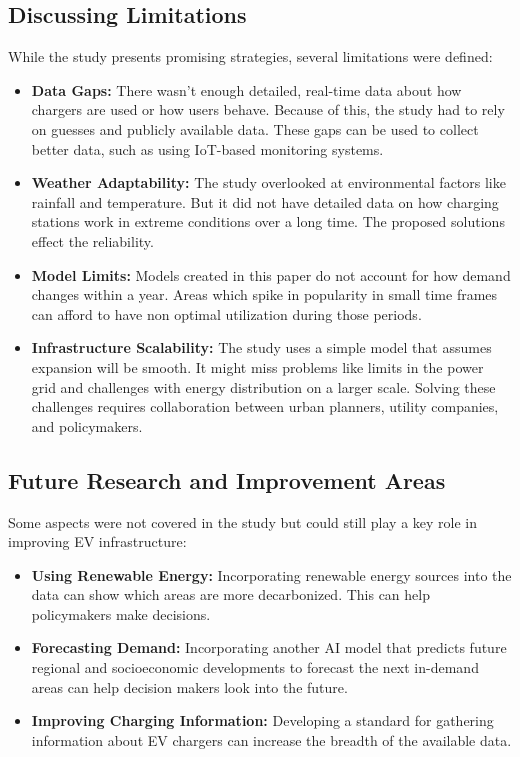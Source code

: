 \subsection{Discussing Limitations}
While the study presents promising strategies, several limitations were defined:
\begin{itemize}
    \item \textbf{Data Gaps:} There wasn’t enough detailed, real-time data about how chargers are used or how users behave. Because of this, the study had to rely on guesses and publicly available data. These gaps can be used to collect better data, such as using IoT-based monitoring systems.
\end{itemize}
\begin{itemize}
    \item \textbf{Weather Adaptability:} The study overlooked at environmental factors like rainfall and temperature. But it did not have detailed data on how charging stations work in extreme conditions over a long time. The proposed solutions effect the reliability.
\end{itemize}
\begin{itemize}
    \item \textbf{Model Limits:} Models created in this paper do not account for how demand changes within a year. Areas which spike in popularity in small time frames can afford to have non optimal utilization during those periods.
\end{itemize}
\begin{itemize}
    \item \textbf{Infrastructure Scalability:} The study uses a simple model that assumes expansion will be smooth. It might miss problems like limits in the power grid and challenges with energy distribution on a larger scale. Solving these challenges requires collaboration between urban planners, utility companies, and policymakers.
\end{itemize}
\subsection{Future Research and Improvement Areas}
Some aspects were not covered in the study but could still play a key role in improving EV infrastructure:
\begin{itemize}
    \item \textbf{Using Renewable Energy:} Incorporating renewable energy sources into the data can show which areas are more decarbonized. This can help policymakers make decisions.
\end{itemize}
\begin{itemize}
    \item \textbf{Forecasting Demand:} Incorporating another AI model that predicts future regional and socioeconomic developments to forecast the next in-demand areas can help decision makers look into the future.
\end{itemize}
\begin{itemize}
    \item \textbf{Improving Charging Information:} Developing a standard for gathering information about EV chargers can increase the breadth of the available data.
\end{itemize}
